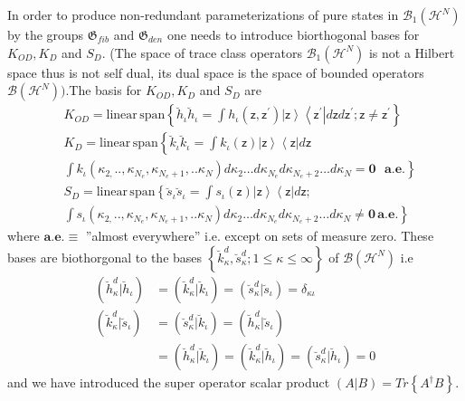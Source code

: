 \documentclass[aps,preprint]{revtex4}%
\begin{document}
In order to produce non-redundant parameterizations of pure states in
$\mathcal{B}_{1}\left(  \mathcal{H}^{N}\right)  $ by the groups $\mathfrak{G}%
_{fib}$ and $\mathfrak{G}_{den}$ one needs to introduce biorthogonal bases for
$K_{OD},K_{D}$ and $S_{D}$. (The space of trace class operators $\mathcal{B}%
_{1}\left(  \mathcal{H}^{N}\right)  $ is not a Hilbert space thus is not self
dual, its dual space is the space of bounded operators $\mathcal{B}\left(
\mathcal{H}^{N}\right)  )$.The basis for $K_{OD},K_{D}$ and $S_{D}$ are
\begin{align}
&  K_{OD}=\mathrm{linear\,span}\left\{  \breve{h}_{\iota}\breve{h}_{\iota
}=\int h_{\iota}\left(  \mathsf{z}\mathbf{,}\mathsf{z}^{\prime}\right)
\left|  \mathsf{z}\right\rangle \left\langle \mathsf{z}^{\prime}\right|
d\mathsf{z}d\mathsf{z}^{\prime};\mathsf{z}\mathbf{\neq}\mathsf{z}^{\prime
}\right\} \\
&  K_{D}=\mathrm{linear\,span}\left\{  \breve{k}_{\iota}\breve{k}_{\iota}=\int
k_{\iota}\left(  \mathsf{z}\right)  \left|  \mathsf{z}\right\rangle
\left\langle \mathsf{z}\right|  d\mathsf{z}\right. \nonumber\\
&  \left.  \int k_{\iota}\left(  \kappa_{2,}..,\kappa_{N_{e}},\kappa_{N_{e}%
+1},..\kappa_{N}\right)  d\kappa_{2}\ldots d\kappa_{N_{e}}d\kappa_{N_{e}%
+2}\ldots d\kappa_{N}\mathbf{=0}\text{ }\mathbf{a.e.}\right\} \label{kbasis}\\
&  S_{D}=\mathrm{linear\,span}\left\{  \breve{s}_{\iota}\breve{s}_{\iota}=\int
s_{\iota}\left(  \mathsf{z}\right)  \left|  \mathsf{z}\right\rangle
\left\langle \mathsf{z}\right|  d\mathsf{z}\right.  ;\nonumber\\
&  \left.  \int s_{\iota}\left(  \kappa_{2,}..,\kappa_{N_{e}},\kappa_{N_{e}%
+1},..\kappa_{N}\right)  d\kappa_{2}\ldots d\kappa_{N_{e}}d\kappa_{N_{e}%
+2}\ldots d\kappa_{N}\mathbf{\neq0\,a.e.}\right\}  \label{sbasis}%
\end{align}
where $\mathbf{a.e.\equiv}$ ''almost everywhere'' i.e. except on sets of
measure zero. These bases are biothorgonal to the bases $\left\{  \breve
{k}_{\kappa}^{d},\breve{s}_{\kappa}^{d};1\leq\kappa\leq\infty\right\}  $ of
$\mathcal{B}\left(  \mathcal{H}^{N}\right)  $ i.e
\begin{align}
\left(  \breve{h}_{\kappa}^{d}|\breve{h}_{\iota}\right)   &  =\left(
\breve{k}_{\kappa}^{d}|\breve{k}_{\iota}\right)  =\left(  \breve{s}_{\kappa
}^{d}|\breve{s}_{\iota}\right)  =\delta_{\kappa\iota}\nonumber\\
\left(  \breve{k}_{\kappa}^{d}|\breve{s}_{\iota}\right)   &  =\left(
\breve{s}_{\kappa}^{d}|\breve{k}_{\iota}\right)  =\left(  \breve{h}_{\kappa
}^{d}|\breve{s}_{\iota}\right) \nonumber\\
&  =\left(  \breve{h}_{\kappa}^{d}|\breve{k}_{\iota}\right)  =\left(
\breve{k}_{\kappa}^{d}|\breve{h}_{\iota}\right)  =\left(  \breve{s}_{\kappa
}^{d}|\breve{h}_{\iota}\right)  =0
\end{align}
and we have introduced the super operator scalar product $\left(  A|B\right)
=Tr\left\{  A^{\dagger}B\right\}  $.
\end{document}
